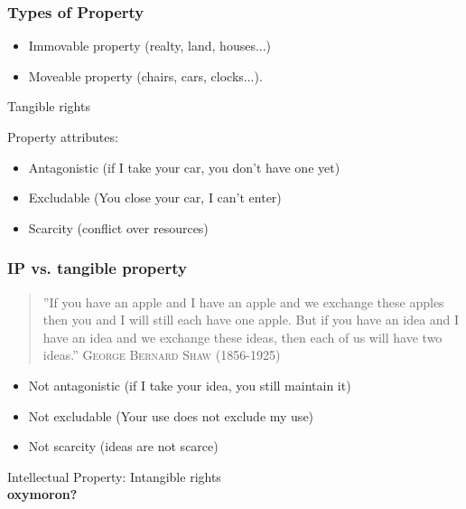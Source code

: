 

\begin{frame}
\frametitle{Types of Property}


\begin{itemize}
\item \alert{Immovable property} (realty, land, houses...) 
\item \alert{Moveable property} (chairs, cars, clocks...).
\end{itemize}
\pause
\begin{center}
\alert{Tangible rights}
\end{center}
\pause
\medskip

Property attributes:
\pause
\begin {itemize}
\item \alert{Antagonistic} (if I take your car, you don't have one yet)
\pause
\item \alert{Excludable} (You close your car, I can't enter)
\pause
\item \alert{Scarcity} (conflict over resources)
\end{itemize}


\end{frame}


\begin{frame}
\frametitle{IP vs. tangible property}

\begin{quote}
\footnotesize{''If you have an apple and I have an apple and we exchange these apples then you and I will still each have one apple. But if you have an idea and I have an idea and we exchange these ideas, then each of us will have two ideas.''} \textsc{George Bernard Shaw} (1856-1925)
\end{quote}

\pause

\begin {itemize}
\item Not antagonistic (if I take your idea, you still maintain it) 
\item Not excludable (Your use does not exclude my use)
\item Not scarcity (ideas are not scarce)
\end{itemize}
\begin{center}
Intellectual Property: \alert{Intangible rights} \\
\pause
\textbf{oxymoron?}
\end{center}
\end{frame}

